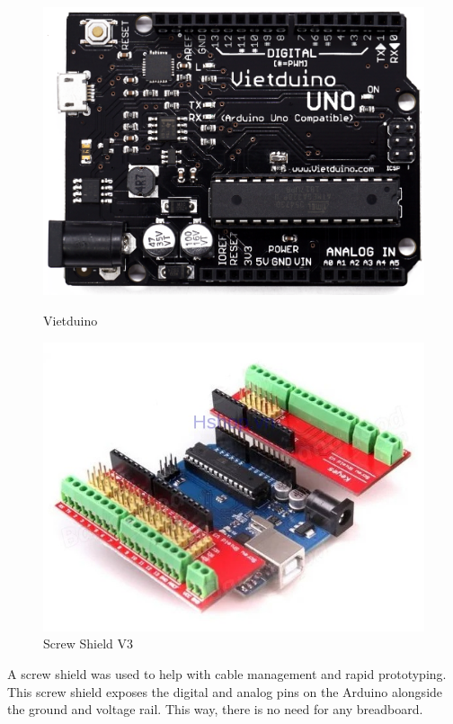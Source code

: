 \begin{figure}[h]
  \centering
  \begin{minipage}[b]{0.4\textwidth}
    \includegraphics[width=\textwidth]{45_vietduino.png}
    \caption{Vietduino \cite{vietduino}}
  \end{minipage}
  \hfill
  \begin{minipage}[b]{0.5\textwidth}
    \includegraphics[width=\textwidth]{46_screwshield.jpeg}
    \caption{Screw Shield V3 \cite{screwshield}}
  \end{minipage}
\end{figure}

A screw shield was used to help with cable management and rapid prototyping. This screw shield exposes the digital and analog pins on the Arduino alongside the ground and voltage rail. This way, there is no need for any breadboard.

